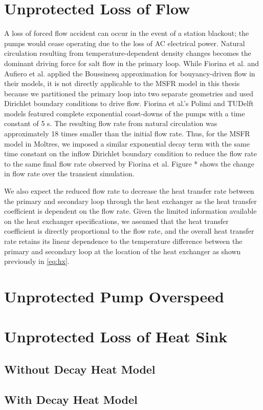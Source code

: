 \section{Unprotected Loss of Flow}

A loss of forced flow accident can occur in the event of a station
blackout; the pumps would cease operating due to the loss of AC electrical
power. Natural circulation resulting from temperature-dependent density
changes becomes the dominant driving force for salt flow in the primary loop.
While Fiorina et al. \cite{fiorina_modelling_2014} and Aufiero et al.
\cite{aufiero_development_2014} applied the Boussinesq approximation for
bouyancy-driven flow in their models, it is not directly applicable to the
\gls{MSFR} model in this thesis because we partitioned the primary loop into
two separate geometries and used Dirichlet boundary conditions to drive flow.
Fiorina et al.'s Polimi and TUDelft models featured complete exponential
coast-downs of the pumps with a time constant of 5 s. The resulting flow rate
from natural circulation was approximately 18 times smaller than the initial
flow rate. Thus, for the \gls{MSFR} model in Moltres, we imposed a similar
exponential decay term with the same time constant on the inflow Dirichlet
boundary condition to reduce the flow rate to the same final flow rate
observed by Fiorina et al. Figure * shows the change in flow rate over the
transient simulation.

We also expect the reduced flow rate to decrease the heat transfer rate
between the primary and secondary loop through the heat exchanger as the heat
transfer coefficient is dependent on the flow rate. Given the limited
information available on the heat exchanger specifications, we assumed that
the heat transfer coefficient is directly proportional to the flow rate, and
the overall heat transfer rate retains its linear dependence to the
temperature difference between the primary and secondary loop at the location
of the heat exchanger as shown previously in \ref{eq:hx}.



\section{Unprotected Pump Overspeed}



\section{Unprotected Loss of Heat Sink}

\subsection{Without Decay Heat Model}

\subsection{With Decay Heat Model}
